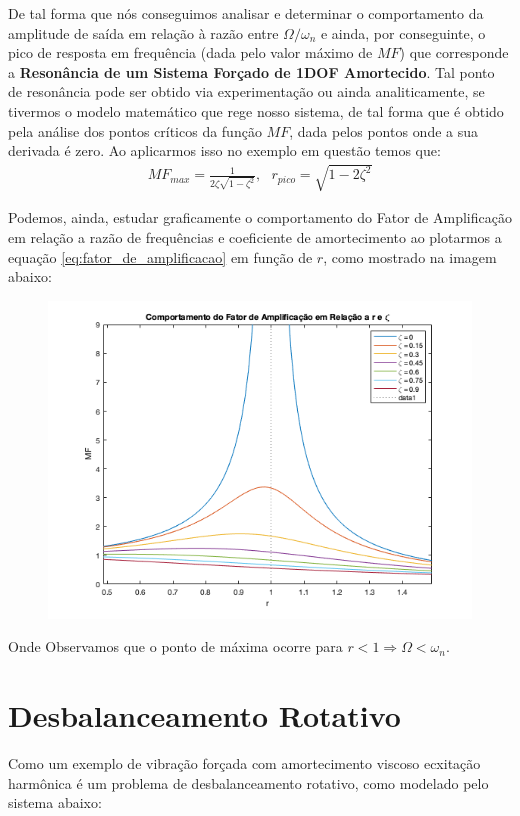 \documentclass{article}
\begin{document}
            De tal forma que nós conseguimos analisar e determinar o comportamento da amplitude de saída em relação à razão entre $\Omega/\omega_n$ e ainda, por conseguinte, o pico de resposta em frequência (dada pelo valor máximo de $MF$) que corresponde a \textbf{Resonância de um Sistema Forçado de 1DOF
            Amortecido}. Tal ponto de resonância pode ser obtido via experimentação ou ainda analiticamente, se tivermos o modelo matemático que rege nosso sistema, de tal forma que é obtido pela análise
            dos pontos críticos da função $MF$, dada pelos pontos onde a sua derivada é zero. Ao aplicarmos isso no exemplo em questão temos que:
            \begin{align}
                MF_{max} = \frac{1}{2\zeta\sqrt{1-\zeta^2}}, \ \ \ r_{pico} = \sqrt{1 - 2\zeta^2}
            \end{align}

            Podemos, ainda, estudar graficamente o comportamento do Fator de Amplificação em relação a razão de frequências e coeficiente de amortecimento ao plotarmos a equação \ref{eq:fator_de_amplificacao} em função de $r$, como
            mostrado na imagem abaixo:

            \begin{figure}[h]
                \centering
                \includegraphics[width=.5\textwidth]{imgs/fator_ampl.png}
            \end{figure}

            Onde Observamos que o ponto de máxima ocorre para $r < 1 \Rightarrow \Omega < \omega_n$.

            \newpage
        \section{Desbalanceamento Rotativo}
            Como um exemplo de vibração forçada com amortecimento viscoso ecxitação harmônica  é um problema de desbalanceamento rotativo, como modelado pelo sistema abaixo:
\end{document}

